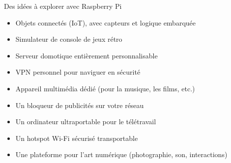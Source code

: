 \documentclass[
aspectratio=169 %
]{beamer}
\begin{document}
\begin{frame}{Des idées à explorer avec Raspberry Pi}
  \begin{itemize}
    \item Objets connectés (IoT), avec capteurs et logique embarquée
    \item Simulateur de console de jeux rétro
    \item Serveur domotique entièrement personnalisable
    \item VPN personnel pour naviguer en sécurité
    \item Appareil multimédia dédié (pour la musique, les films, etc.)
    \item Un bloqueur de publicités sur votre réseau
    \item Un ordinateur ultraportable pour le télétravail
    \item Un hotspot Wi-Fi sécurisé transportable
    \item Une plateforme pour l'art numérique (photographie, son, interactions)
  \end{itemize}

\end{frame}
\end{document}
